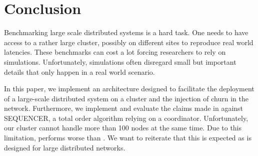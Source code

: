 \section{Conclusion}
\label{sec:conclusion}
Benchmarking large scale distributed systems is a hard task. One needs to have access to a rather large cluster, possibly on different sites to reproduce real world latencies. These benchmarks can cost a lot forcing researchers to rely on simulations. Unfortunately, simulations often disregard small but important details that only happen in a real world scenario.

In this paper, we implement \eptotester an architecture designed to facilitate the deployment of a large-scale distributed system on a cluster and the injection of churn in the network. Furthermore, we implement \epto and evaluate the claims made in \autocite{matos2015epto} against \jgroups SEQUENCER, a total order algorithm relying on a coordinator. Unfortunately, our cluster cannot handle more than 100 nodes at the same time. Due to this limitation, \epto performs worse than \jgroups. We want to reiterate that this is expected as \epto is designed for large distributed networks. 